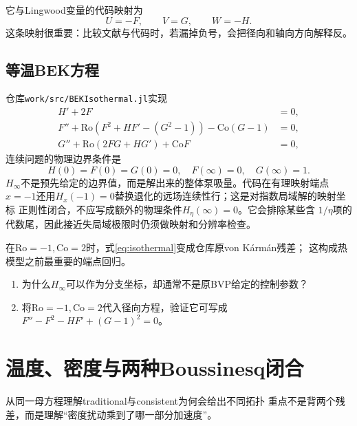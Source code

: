 \documentclass[UTF8,zihao=-4,openany]{ctexbook}
\newcommand{\Ro}{\mathrm{Ro}}
\newcommand{\Co}{\mathrm{Co}}
\begin{document}
它与Lingwood变量的代码映射为
\begin{equation}
  U=-F,\qquad V=G,\qquad W=-H.
\end{equation}
这条映射很重要：比较文献与代码时，若漏掉负号，会把径向和轴向方向解释反。

\section{等温BEK方程}

仓库\texttt{work/src/BEKIsothermal.jl}实现
\begin{subequations}\label{eq:isothermal}
\begin{align}
 H'+2F&=0,\\
 F''+\Ro\left(F^2+HF'-(G^2-1)\right)-\Co(G-1)&=0,\\
 G''+\Ro\left(2FG+HG'\right)+\Co F&=0,
\end{align}
\end{subequations}
连续问题的物理边界条件是
\begin{equation}\label{eq:iso_bc}
 H(0)=F(0)=G(0)=0,\quad F(\infty)=0,\quad G(\infty)=1.
\end{equation}
$H_\infty$不是预先给定的边界值，而是解出来的整体泵吸量。代码在有理映射端点
$x=-1$还用$H_x(-1)=0$替换退化的远场连续性行；这是对指数局域解的映射坐标
正则性闭合，不应写成额外的物理条件$H_\eta(\infty)=0$。它会排除某些含
$1/\eta$项的代数尾，因此接近失局域极限时仍须做映射和分辨率检查。

在$\Ro=-1,\Co=2$时，式\eqref{eq:isothermal}变成仓库原von K\'arm\'an残差；
这构成热模型之前最重要的端点回归。

\enlargethispage{5\baselineskip}
\begin{checkpoint}
\begin{enumerate}
  \item 为什么$H_\infty$可以作为分支坐标，却通常不是原BVP给定的控制参数？
  \item 将$\Ro=-1,\Co=2$代入径向方程，验证它可写成
  $F''-F^2-HF'+(G-1)^2=0$。
\end{enumerate}
\end{checkpoint}

\chapter{温度、密度与两种Boussinesq闭合}\label{ch:models}

\begin{learninggoal}{从同一母方程理解traditional与consistent为何会给出不同拓扑}
重点不是背两个残差，而是理解“密度扰动乘到了哪一部分加速度”。
\end{learninggoal}
\end{document}
